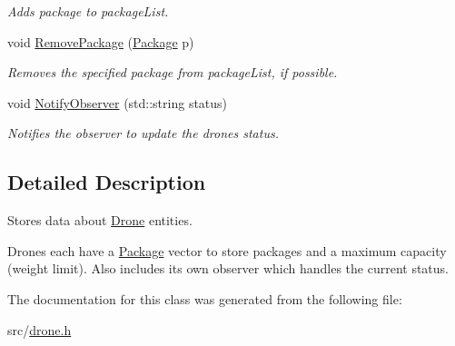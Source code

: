 \begin{DoxyCompactItemize}
\begin{DoxyCompactList}\small\item\em Adds package to package\+List. \end{DoxyCompactList}\item 
\mbox{\label{classcsci3081_1_1Drone_a2b3d369000db426ad56fe5866b970544}} 
void \hyperlink{classcsci3081_1_1Drone_a2b3d369000db426ad56fe5866b970544}{Remove\+Package} (\hyperlink{classcsci3081_1_1Package}{Package} p)
\begin{DoxyCompactList}\small\item\em Removes the specified package from package\+List, if possible. \end{DoxyCompactList}\item 
\mbox{\label{classcsci3081_1_1Drone_a9ce811247637835a1cf8928daf95ce78}} 
void \hyperlink{classcsci3081_1_1Drone_a9ce811247637835a1cf8928daf95ce78}{Notify\+Observer} (std\+::string status)
\begin{DoxyCompactList}\small\item\em Notifies the observer to update the drone\textquotesingle{}s status. \end{DoxyCompactList}\end{DoxyCompactItemize}


\subsection{Detailed Description}
Stores data about \hyperlink{classcsci3081_1_1Drone}{Drone} entities. 

Drones each have a \hyperlink{classcsci3081_1_1Package}{Package} vector to store packages and a maximum capacity (weight limit). Also includes its own observer which handles the current status. 

The documentation for this class was generated from the following file\+:\begin{DoxyCompactItemize}
\item 
src/\hyperlink{drone_8h}{drone.\+h}\end{DoxyCompactItemize}
